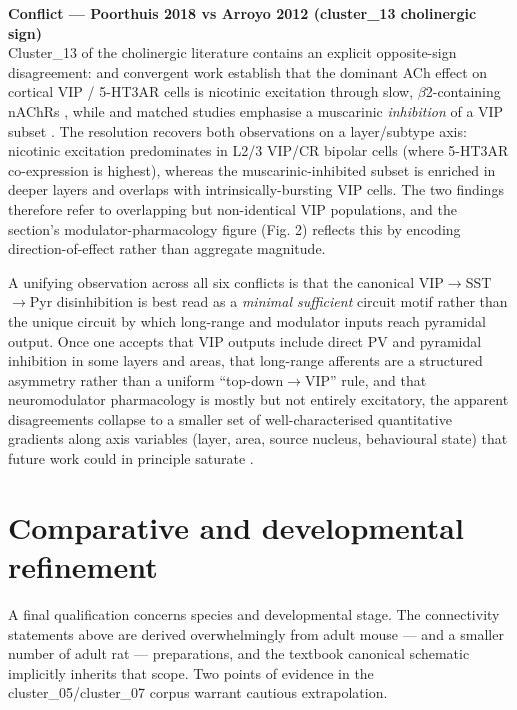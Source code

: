 \documentclass[11pt]{article}
\let\origrightarrow\rightarrow
\def\rightarrow{\ensuremath{\origrightarrow}}
\begin{document}
\begin{framed}
\textbf{Conflict --- Poorthuis 2018 vs Arroyo 2012 (cluster\_13 cholinergic sign)}\\
Cluster\_13 of the cholinergic literature contains an explicit opposite-sign disagreement: \citet{Arroyo2012} and convergent work establish that the dominant ACh effect on cortical VIP / 5-HT3AR cells is nicotinic excitation through slow, $\beta$2-containing nAChRs \citep{Arroyo2012, Porter1999, Fu2014}, while \citet{Poorthuis2018} and matched studies emphasise a muscarinic \textit{inhibition} of a VIP subset \citep{Poorthuis2018, Obermayer2019, Granger2020}. The resolution recovers both observations on a layer/subtype axis: nicotinic excitation predominates in L2/3 VIP/CR bipolar cells (where 5-HT3AR co-expression is highest), whereas the muscarinic-inhibited subset is enriched in deeper layers and overlaps with intrinsically-bursting VIP cells. The two findings therefore refer to overlapping but non-identical VIP populations, and the section's modulator-pharmacology figure (Fig. 2) reflects this by encoding direction-of-effect rather than aggregate magnitude.
\end{framed}

A unifying observation across all six conflicts is that the canonical VIP\rightarrow SST\rightarrow Pyr disinhibition is best read as a \textit{minimal sufficient} circuit motif rather than the unique circuit by which long-range and modulator inputs reach pyramidal output. Once one accepts that VIP outputs include direct PV and pyramidal inhibition in some layers and areas, that long-range afferents are a structured asymmetry rather than a uniform ``top-down\rightarrow VIP'' rule, and that neuromodulator pharmacology is mostly but not entirely excitatory, the apparent disagreements collapse to a smaller set of well-characterised quantitative gradients along axis variables (layer, area, source nucleus, behavioural state) that future work could in principle saturate \citep{Wall2016, Pfeffer2013, Yu2019, Pi2013, Lee2013, Karnani2016a, Sabri2024, Anastasiades2021a, Pronneke2019, Tasic2018}.

\section{Comparative and developmental refinement}

A final qualification concerns species and developmental stage. The connectivity statements above are derived overwhelmingly from adult mouse --- and a smaller number of adult rat --- preparations, and the textbook canonical schematic implicitly inherits that scope. Two points of evidence in the cluster\_05/cluster\_07 corpus warrant cautious extrapolation.
\end{document}
